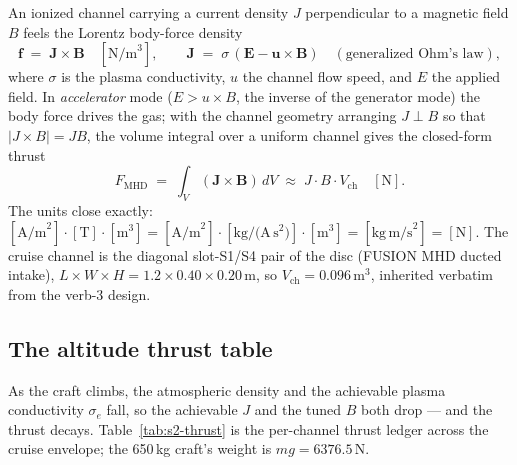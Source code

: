 An ionized channel carrying a current density $J$ perpendicular to a
magnetic field $B$ feels the Lorentz body-force density
\begin{equation}
\mathbf{f} \;=\; \mathbf{J}\times\mathbf{B}\quad[\text{N/m}^3],
\qquad
\mathbf{J} \;=\; \sigma\,(\mathbf{E}-\mathbf{u}\times\mathbf{B})
\quad(\text{generalized Ohm's law}),
\label{eq:s2-ohm}
\end{equation}
where $\sigma$ is the plasma conductivity, $u$ the channel flow speed,
and $E$ the applied field. In \emph{accelerator} mode ($E>u\!\times\!B$,
the inverse of the generator mode) the body force drives the gas; with
the channel geometry arranging $J\perp B$ so that $|J\times B|=JB$, the
volume integral over a uniform channel gives the closed-form thrust
\begin{equation}
F_{\text{MHD}}
 \;=\; \int_V (\mathbf{J}\times\mathbf{B})\,dV
 \;\approx\; J\cdot B\cdot V_{\text{ch}}\quad[\text{N}].
\label{eq:s2-thrust}
\end{equation}
The units close exactly:
$[\text{A/m}^2]\!\cdot\![\text{T}]\!\cdot\![\text{m}^3]
=[\text{A/m}^2]\!\cdot\![\text{kg/(A}\,\text{s}^2)]\!\cdot\![\text{m}^3]
=[\text{kg}\,\text{m/s}^2]=[\text{N}]$. The cruise channel is the
diagonal slot-S1/S4 pair of the disc (FUSION MHD ducted intake),
$L\times W\times H = 1.2\times0.40\times0.20$\,m, so
$V_{\text{ch}}=0.096$\,m$^3$, inherited verbatim from the verb-3 design.

\subsection{The altitude thrust table}
\label{app:stage2-table}

As the craft climbs, the atmospheric density and the achievable plasma
conductivity $\sigma_e$ fall, so the achievable $J$ and the tuned $B$
both drop --- and the thrust decays. Table~\ref{tab:s2-thrust} is the
per-channel thrust ledger across the cruise envelope; the 650\,kg craft's
weight is $mg=6376.5$\,N.

